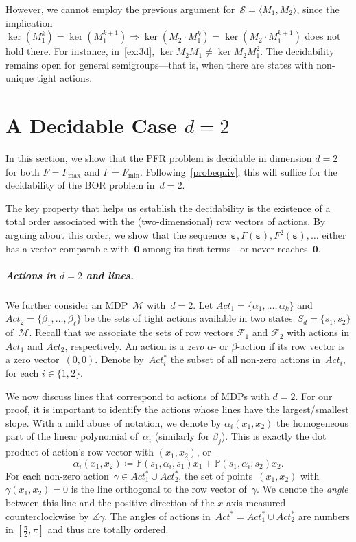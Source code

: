 \documentclass[preprint,12pt]{elsarticle}
\theoremstyle{plain}
\theoremstyle{definition}
\theoremstyle{remark}
\theoremstyle{claimstyle}
\newcommand{\mdp}{\mathcal{M}}
\newcommand{\prob}{\mathbb{P}}
\newcommand{\eps}{\bm{\varepsilon}}
\begin{document}
However, we cannot employ the previous argument for~$\mathcal{S} = \langle M_1, M_2 \rangle$,
since the implication 
$\ker (M_1^k) = \ker(M_1^{k+1}) \Rightarrow \ker (M_2\cdot M_1^k) = \ker(M_2 \cdot M_1^{k+1})$ does not hold there.
For instance, in~\cref{ex:3d}, $\ker M_2M_1 \neq \ker M_2M_1^2$.
The decidability remains open for general semigroups---that is, when there are states with non-unique tight actions.
\section{A Decidable Case $d=2$}
\label{sec:2d}
In this section, we show that the PFR problem is decidable in dimension $d = 2$ for both $F = F_{\max}$ and $F = F_{\min}$.
Following~\cref{probequiv}, this will suffice for the decidability of the BOR problem in~$d=2$.

The key property that %
helps us establish the decidability is the existence of a total order associated with the (two-dimensional) row vectors of actions.
By arguing about this order, we show that the sequence~$\eps, F(\eps), F^2(\eps), \dots$ either has a vector comparable with~$\bm{0}$ among its first terms---or never reaches~$\bm{0}$.
\subparagraph{Actions in $d=2$ and lines.}
We further consider an MDP~$\mdp$ with~$d=2$.
Let $Act_1 = \{\alpha_1, \dots, \alpha_k\}$ and $Act_2 = \{\beta_1, \dots, \beta_\ell\}$ be the sets of tight actions available in two states~$S_d = \{s_1, s_2\}$ of~$\mdp$.
Recall that we associate the sets of row vectors $\mathcal{F}_1$ and $\mathcal{F}_2$ with actions in $Act_1$ and $Act_2$, respectively.
An action is a \emph{zero} $\alpha$- or $\beta$-action if its row vector is a zero vector~$(0, 0)$.
Denote by~$Act_i^*$ the subset of all non-zero actions in~$Act_i$, for each $i \in \{ 1, 2\}$.

We now discuss lines that correspond to actions of MDPs with $d=2$.
For our proof, it is important to identify the actions whose lines have the largest/smallest slope.
With a mild abuse of notation, we denote by $\alpha_i(x_1, x_2)$ the homogeneous part of the linear polynomial of~$\alpha_i$ (similarly for $\beta_j$).
This is exactly the dot product of action's row vector with $(x_1, x_2)$, or
\[\alpha_i(x_1, x_2) \coloneq \prob(s_1, \alpha_i, s_1) x_1 + \prob(s_1, \alpha_i, s_2) x_2.\]
For each non-zero action~$\gamma\in Act_1^* \cup Act_2^*$, the set of points~$(x_1, x_2)$ with $\gamma(x_1,x_2) = 0$ is the line orthogonal to the row vector of~$\gamma$.
We denote the \emph{angle} between this line and the positive direction of the $x$-axis measured counterclockwise by $\measuredangle\gamma$.
The angles of actions in~$Act^* = Act_1^* \cup Act_2^*$ are
numbers in $[\frac{\pi}{2}, \pi]$ and thus are totally ordered.
\end{document}
